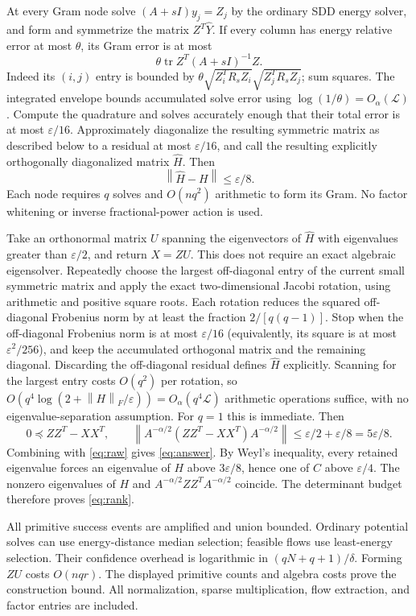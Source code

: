 \documentclass[11pt]{article}
\newcommand{\tr}{\operatorname{tr}}
\newcommand{\norm}[1]{\left\lVert#1\right\rVert}
\begin{document}
At every Gram node solve $(A+sI)y_j=Z_j$ by the ordinary SDD energy
solver, and form and symmetrize the matrix $Z^T\widehat Y$.
If every column has energy relative error at most $\theta$, its Gram
error is at most
\[
 \theta\tr Z^T(A+sI)^{-1}Z.
\]
Indeed its $(i,j)$ entry is bounded by
$\theta\sqrt{Z_i^TR_sZ_i}\sqrt{Z_j^TR_sZ_j}$; sum squares.
The integrated envelope bounds accumulated solve error using
$\log(1/\theta)=O_\alpha(\mathcal L)$.
Compute the quadrature and solves accurately enough that their total
error is at most $\varepsilon/16$. Approximately diagonalize the
resulting symmetric matrix as described below to a residual at most
$\varepsilon/16$, and call the resulting explicitly orthogonally
diagonalized matrix $\widehat H$. Then
\begin{equation}\label{eq:gramerr}
 \norm{\widehat H-H}\le\varepsilon/8.
\end{equation}
Each node requires $q$ solves and $O(nq^2)$ arithmetic to form its
Gram. No factor whitening or inverse fractional-power action is used.

Take an orthonormal matrix $U$ spanning the eigenvectors of
$\widehat H$ with eigenvalues greater than $\varepsilon/2$, and
return $X=ZU$. This does not require an exact algebraic eigensolver.
Repeatedly choose the largest off-diagonal entry of the current small
symmetric matrix and apply the exact two-dimensional Jacobi rotation,
using arithmetic and positive square roots. Each rotation reduces the
squared off-diagonal Frobenius norm by at least the fraction
$2/[q(q-1)]$. Stop when the off-diagonal Frobenius norm is at most
$\varepsilon/16$ (equivalently, its square is at most
$\varepsilon^2/256$),
and keep the accumulated orthogonal matrix and the remaining diagonal.
Discarding the off-diagonal residual defines $\widehat H$ explicitly.
Scanning for the largest entry costs $O(q^2)$ per rotation, so
$O(q^4\log(2+\norm{H}_F/\varepsilon))=O_\alpha(q^4\mathcal L)$
arithmetic operations suffice, with no eigenvalue-separation assumption.
For $q=1$ this is immediate. Then
\[
 0\preceq ZZ^T-XX^T,\qquad
 \norm{A^{-\alpha/2}(ZZ^T-XX^T)A^{-\alpha/2}}
 \le\varepsilon/2+\varepsilon/8=5\varepsilon/8.
\]
Combining with \eqref{eq:raw} gives \eqref{eq:answer}.
By Weyl's inequality, every retained eigenvalue forces an eigenvalue
of $H$ above $3\varepsilon/8$, hence one of $C$ above
$\varepsilon/4$. The nonzero eigenvalues of $H$ and
$A^{-\alpha/2}ZZ^TA^{-\alpha/2}$ coincide. The determinant budget
therefore proves \eqref{eq:rank}.

All primitive success events are amplified and union bounded.
Ordinary potential solves can use energy-distance median selection;
feasible flows use least-energy selection. Their confidence overhead
is logarithmic in $(qN+q+1)/\delta$. Forming $ZU$ costs $O(nqr)$.
The displayed primitive counts and algebra costs prove the construction
bound. All normalization, sparse multiplication, flow extraction, and
factor entries are included.
\end{document}
